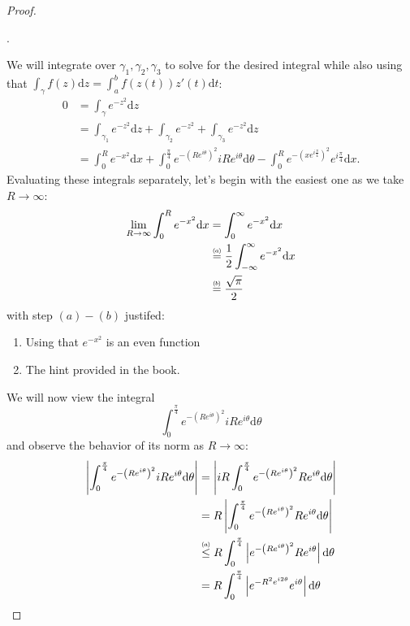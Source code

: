 \documentclass{article}
\newcommand\numeq[1]%
  {\stackrel{\scriptscriptstyle(\mkern-1.5mu#1\mkern-1.5mu)}{=}}
\newcommand\numleq[1]
  {\stackrel{\scriptscriptstyle(\mkern-1.5mu#1\mkern-1.5mu)}{\leq}}
\begin{document}
\begin{proof}
\begin{center}
\begin{tikzpicture}[x=0.75pt,y=0.75pt,yscale=-1,xscale=1]
\end{tikzpicture}
.
\end{center}
We will integrate over $\gamma_1, \gamma_2, \gamma_3$ to solve for the desired integral while also using that $\int_{\gamma} f(z) \mathrm{d}z = \int_a^b f(z(t))z'(t) \mathrm{d}t$:
\begin{align*}
  0 &= \int_{\gamma}e^{-z^2} \mathrm{d}z \\
  &= \int_{\gamma_1}e^{-z^2} \mathrm{d}z + \int_{\gamma_2}e^{-z^2} + \int_{\gamma_3}e^{-z^2} \mathrm{d}z \\
  &= \int_0^R e^{-x^2} \mathrm{d}x + \int_0^{\frac{\pi}{4}} e^{-\left(Re^{i\theta} \right)^2}iRe^{i \theta}  \mathrm{d} \theta - \int_0^Re^{-\left(xe^{i \frac{\pi}{4}}\right)^2}e^{i \frac{\pi}{4}} \mathrm{d}x. 
\end{align*}
Evaluating these integrals separately, let's begin with the easiest one as we take $R \to \infty$:
\begin{align*}
  \lim\limits_{R \to \infty} \int_0^R e^{-x^2} \mathrm{d}x &= \int_0^{\infty} e^{-x^2} \mathrm{d}x \\
  &\numeq{a} \frac{1}{2}\int_{-\infty}^{\infty} e^{-x^2} \mathrm{d}x \\
  &\numeq{b} \frac{\sqrt{\pi}}{2} 
\end{align*}
with step $(a) - (b)$ justifed:
\begin{enumerate}[\indent(a)]
  \item Using that $e^{-x^2}$ is an even function
  \item The hint provided in the book. 
\end{enumerate}
We will now view the integral 
  \[
  \int_0^{\frac{\pi}{4}}e^{-\left(Re^{i\theta} \right)^2}iRe^{i \theta} \mathrm{d}\theta  
  \]
  and observe the behavior of its norm as $R \to \infty$:
  \begin{align*}
    \left|\int_0^{\frac{\pi}{4}}e^{-\left(Re^{i\theta} \right)^2}iRe^{i \theta} \mathrm{d}\theta \right| &= \left|iR \int_0^{\frac{\pi}{4}}e^{-\left(Re^{i\theta} \right)^2}Re^{i \theta} \mathrm{d}\theta \right| \\
    &= R \left|\int_0^{\frac{\pi}{4}}e^{-\left(Re^{i\theta} \right)^2}Re^{i \theta} \mathrm{d}\theta \right| \\
    &\numleq{a} R\int_0^{\frac{\pi}{4}} \left|e^{-\left(Re^{i\theta} \right)^2}Re^{i \theta} \right| \mathrm{d} \theta \\
    &= R\int_0^{\frac{\pi}{4}} \left|e^{-R^2e^{i2\theta}}e^{i \theta} \right| \mathrm{d}\theta \\

\end{align*}
\end{proof}
\end{document}
